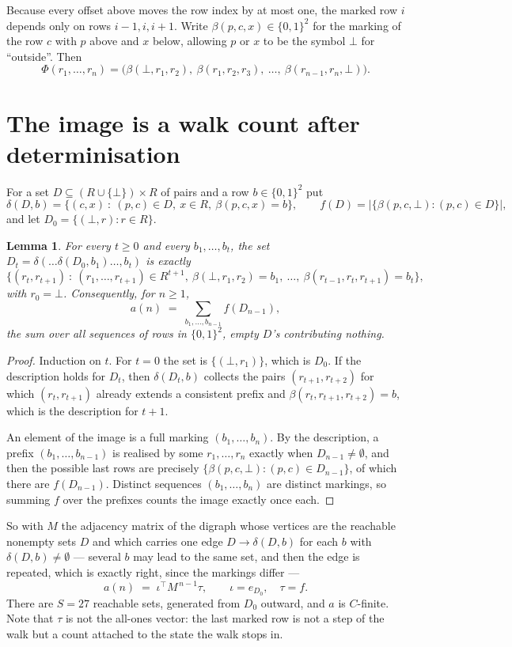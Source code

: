 \documentclass[11pt,a4paper]{article}
\theoremstyle{plain}
\newtheorem{lemma}[theorem]{Lemma}
\theoremstyle{definition}
\begin{document}
Because every offset above moves the row index by at most one, the marked row $i$ depends only
on rows $i-1,i,i+1$. Write $\beta(p,c,x)\in\{0,1\}^{2}$ for the marking of the row $c$
with $p$ above and $x$ below, allowing $p$ or $x$ to be the symbol $\bot$ for ``outside''.
Then
\[
\Phi(r_1,\dots,r_n)=\bigl(\beta(\bot,r_1,r_2),\ \beta(r_1,r_2,r_3),\ \dots,\
\beta(r_{n-1},r_n,\bot)\bigr).
\]

\section{The image is a walk count after determinisation}

For a set $D\subseteq(R\cup\{\bot\})\times R$ of pairs and a row $b\in\{0,1\}^{2}$ put
\[
\delta(D,b)=\{(c,x)\ :\ (p,c)\in D,\ x\in R,\ \beta(p,c,x)=b\},\qquad
f(D)=\bigl|\{\beta(p,c,\bot):(p,c)\in D\}\bigr| ,
\]
and let $D_0=\{(\bot,r):r\in R\}$.

\begin{lemma}\label{lem:det}
For every $t\ge0$ and every $b_1,\dots,b_t$, the set
$D_t=\delta(\dots\delta(D_0,b_1)\dots,b_t)$ is exactly
\[
\{(r_t,r_{t+1})\ :\ (r_1,\dots,r_{t+1})\in R^{t+1},\ \beta(\bot,r_1,r_2)=b_1,\ \dots,\
\beta(r_{t-1},r_t,r_{t+1})=b_t\} ,
\]
with $r_0=\bot$. Consequently, for $n\ge1$,
\[
a(n)\;=\;\sum_{b_1,\dots,b_{n-1}}f(D_{n-1}),
\]
the sum over all sequences of rows in $\{0,1\}^{2}$, empty $D$'s contributing nothing.
\end{lemma}

\begin{proof}
Induction on $t$. For $t=0$ the set is $\{(\bot,r_1)\}$, which is $D_0$. If the description
holds for $D_t$, then $\delta(D_t,b)$ collects the pairs $(r_{t+1},r_{t+2})$ for which
$(r_t,r_{t+1})$ already extends a consistent prefix and
$\beta(r_t,r_{t+1},r_{t+2})=b$, which is the description for $t+1$.

An element of the image is a full marking $(b_1,\dots,b_n)$. By the description, a prefix
$(b_1,\dots,b_{n-1})$ is realised by some $r_1,\dots,r_n$ exactly when $D_{n-1}\neq
\emptyset$, and then the possible last rows are precisely
$\{\beta(p,c,\bot):(p,c)\in D_{n-1}\}$, of which there are $f(D_{n-1})$. Distinct
sequences $(b_1,\dots,b_n)$ are distinct markings, so summing $f$ over the prefixes counts the
image exactly once each.
\end{proof}

So with $M$ the adjacency matrix of the digraph whose vertices are the reachable nonempty sets
$D$ and which carries one edge $D\to\delta(D,b)$ for each $b$ with $\delta(D,b)\neq\emptyset$
--- several $b$ may lead to the same set, and then the edge is repeated, which is exactly
right, since the markings differ ---
\[
a(n)\;=\;\iota^{\!\top}M^{\,n-1}\tau,\qquad \iota=e_{D_0},\quad \tau=f .
\]
There are $S=27$ reachable sets, generated from $D_0$ outward, and $a$ is $C$-finite. Note
that $\tau$ is not the all-ones vector: the last marked row is not a step of the walk but a
count attached to the state the walk stops in.
\end{document}

